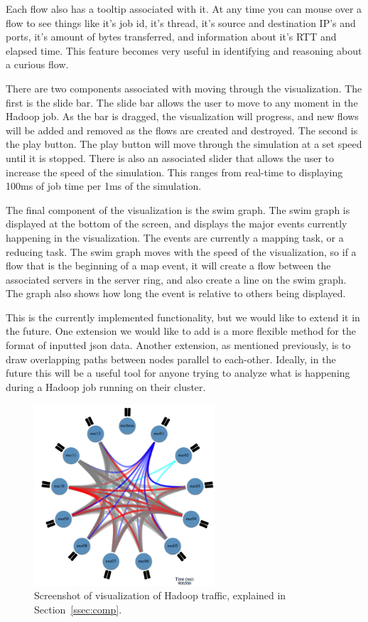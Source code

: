 Each flow also has a tooltip associated with it. At any time you can
mouse over a flow to see things like it's job id, it's thread, it's
source and destination IP's and ports, it's amount of bytes
transferred, and information about it's RTT and elapsed time. This
feature becomes very useful in identifying and reasoning about a
curious flow.

There are two components associated with moving through the
visualization. The first is the slide bar. The slide bar allows the
user to move to any moment in the Hadoop job. As the bar is dragged,
the visualization will progress, and new flows will be added and
removed as the flows are created and destroyed. The second is the play
button. The play button will move through the simulation at a set
speed until it is stopped. There is also an associated slider that
allows the user to increase the speed of the simulation. This ranges
from real-time to displaying 100ms of job time per 1ms of the
simulation.

The final component of the visualization is the swim graph. The swim
graph is displayed at the bottom of the screen, and displays the major
events currently happening in the visualization. The events are
currently a mapping task, or a reducing task. The swim graph moves
with the speed of the visualization, so if a flow that is the
beginning of a map event, it will create a flow between the associated
servers in the server ring, and also create a line on the swim graph.
The graph also shows how long the event is relative to others being
displayed.

This is the currently implemented functionality, but we would like to
extend it in the future. One extension we would like to add is a more
flexible method for the format of inputted json data. Another
extension, as mentioned previously, is to draw overlapping paths
between nodes parallel to each-other. Ideally, in the future this will
be a useful tool for anyone trying to analyze what is happening during
a Hadoop job running on their cluster.

\begin{figure}
\centering
\includegraphics[width=0.6\textwidth]{figures/hadoop-viz.png}
\caption{Screenshot of visualization of Hadoop traffic, explained in Section~\ref{ssec:comp}.}
\label{fig:viz}
\end{figure}
